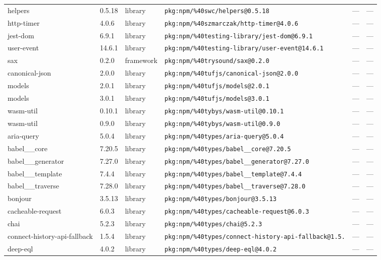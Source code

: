\documentclass[11pt]{article}
\begin{document}
\begin{longtable}{|l|l|l|p{2.2cm}|l|p{4cm}|}
helpers & 0.5.18 & library & \texttt{pkg:npm/\%40swc/helpers@0.5.18} & — & — \\
http-timer & 4.0.6 & library & \texttt{pkg:npm/\%40szmarczak/http-timer@4.0.6} & — & — \\
jest-dom & 6.9.1 & library & \texttt{pkg:npm/\%40testing-library/jest-dom@6.9.1} & — & — \\
user-event & 14.6.1 & library & \texttt{pkg:npm/\%40testing-library/user-event@14.6.1} & — & — \\
sax & 0.2.0 & framework & \texttt{pkg:npm/\%40trysound/sax@0.2.0} & — & — \\
canonical-json & 2.0.0 & library & \texttt{pkg:npm/\%40tufjs/canonical-json@2.0.0} & — & — \\
models & 2.0.1 & library & \texttt{pkg:npm/\%40tufjs/models@2.0.1} & — & — \\
models & 3.0.1 & library & \texttt{pkg:npm/\%40tufjs/models@3.0.1} & — & — \\
wasm-util & 0.10.1 & library & \texttt{pkg:npm/\%40tybys/wasm-util@0.10.1} & — & — \\
wasm-util & 0.9.0 & library & \texttt{pkg:npm/\%40tybys/wasm-util@0.9.0} & — & — \\
aria-query & 5.0.4 & library & \texttt{pkg:npm/\%40types/aria-query@5.0.4} & — & — \\
babel\_\_core & 7.20.5 & library & \texttt{pkg:npm/\%40types/babel\_\_core@7.20.5} & — & — \\
babel\_\_generator & 7.27.0 & library & \texttt{pkg:npm/\%40types/babel\_\_generator@7.27.0} & — & — \\
babel\_\_template & 7.4.4 & library & \texttt{pkg:npm/\%40types/babel\_\_template@7.4.4} & — & — \\
babel\_\_traverse & 7.28.0 & library & \texttt{pkg:npm/\%40types/babel\_\_traverse@7.28.0} & — & — \\
bonjour & 3.5.13 & library & \texttt{pkg:npm/\%40types/bonjour@3.5.13} & — & — \\
cacheable-request & 6.0.3 & library & \texttt{pkg:npm/\%40types/cacheable-request@6.0.3} & — & — \\
chai & 5.2.3 & library & \texttt{pkg:npm/\%40types/chai@5.2.3} & — & — \\
connect-history-api-fallback & 1.5.4 & library & \texttt{pkg:npm/\%40types/connect-history-api-fallback@1.5.} & — & — \\
deep-eql & 4.0.2 & library & \texttt{pkg:npm/\%40types/deep-eql@4.0.2} & — & — \\

\end{longtable}
\end{document}
